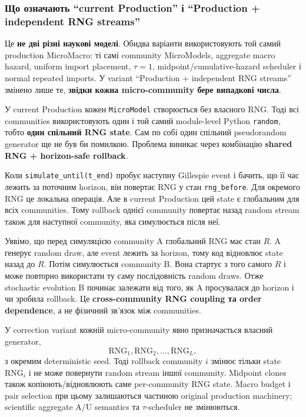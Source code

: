 \documentclass[11pt,a4paper]{article}
\begin{document}
\subsubsection*{Що означають ``current Production'' і ``Production + independent RNG streams''}

Це \textbf{не дві різні наукові моделі}. Обидва варіанти використовують той самий production MicroMacro: ті самі community MicroModels, aggregate macro hazard, uniform import placement, $\tau=1$, midpoint/cumulative-hazard scheduler і normal repeated imports. У variant ``Production + independent RNG streams'' змінено лише те, \textbf{звідки кожна micro-community бере випадкові числа}.

У current Production кожен \texttt{MicroModel} створюється без власного RNG. Тоді всі communities використовують один і той самий module-level Python \texttt{random}, тобто \textbf{один спільний RNG state}. Сам по собі один спільний pseudorandom generator ще не був би помилкою. Проблема виникає через комбінацію \textbf{shared RNG + horizon-safe rollback}.

Коли \texttt{simulate\_until(t\_end)} пробує наступну Gillespie event і бачить, що її час лежить за поточним horizon, він повертає RNG у стан \texttt{rng\_before}. Для окремого RNG це локальна операція. Але в current Production цей state є глобальним для всіх communities. Тому rollback однієї community повертає назад random stream також для наступної community, яка симулюється після неї.

\begin{tcolorbox}[colback=soft,colframe=macro,title=Чому з'являється штучна залежність]
Уявімо, що перед симуляцією community A глобальний RNG має стан $R$. A генерує random draw, але event лежить за horizon, тому код відновлює state назад до $R$. Потім симулюється community B. Вона стартує з того самого $R$ і може повторно використати ту саму послідовність random draws. Отже stochastic evolution B починає залежати від того, як A просувалася до horizon і чи зробила rollback. Це \textbf{cross-community RNG coupling та order dependence}, а не фізичний зв'язок між communities.
\end{tcolorbox}

У correction variant кожній micro-community явно призначається власний generator,
\[
\mathrm{RNG}_1,\mathrm{RNG}_2,\ldots,\mathrm{RNG}_L,
\]
з окремим deterministic seed. Тоді rollback community $i$ змінює тільки state $\mathrm{RNG}_i$ і не може повернути random stream іншої community. Midpoint clones також копіюють/відновлюють саме per-community RNG state. Macro budget і pair selection при цьому залишаються частиною original production machinery; scientific aggregate A/U semantics та $\tau$-scheduler не змінюються.
\end{document}
